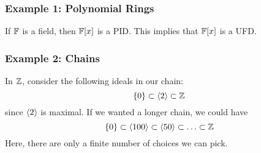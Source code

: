 \documentclass[letterpaper]{article}
\begin{document}
\subsubsection{Example 1: Polynomial Rings}
If $\mathbb{F}$ is a field, then $\mathbb{F}[x]$ is a PID. This implies that $\mathbb{F}[x]$ is a UFD. 

\subsubsection{Example 2: Chains}
In $\mathbb{Z}$, consider the following ideals in our chain:
\[\{0\} \subset \langle 2 \rangle \subset \mathbb{Z}\]
since $\langle 2 \rangle$ is maximal. If we wanted a longer chain, we could have 
\[\{0\} \subset \langle 100 \rangle \subset \langle 50 \rangle \subset \ldots \subset \mathbb{Z}\]
Here, there are only a finite number of choices we can pick. 
\end{document}
